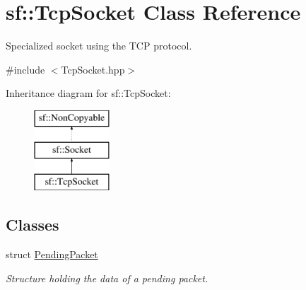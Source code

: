 \hypertarget{classsf_1_1_tcp_socket}{}\section{sf\+:\+:Tcp\+Socket Class Reference}
\label{classsf_1_1_tcp_socket}


Specialized socket using the T\+CP protocol.  




{\ttfamily \#include $<$Tcp\+Socket.\+hpp$>$}

Inheritance diagram for sf\+:\+:Tcp\+Socket\+:\begin{figure}[H]
\begin{center}
\leavevmode
\includegraphics[height=3.000000cm]{classsf_1_1_tcp_socket}
\end{center}
\end{figure}
\subsection*{Classes}
\begin{DoxyCompactItemize}
\item 
struct \mbox{\hyperlink{structsf_1_1_tcp_socket_1_1_pending_packet}{Pending\+Packet}}
\begin{DoxyCompactList}\small\item\em Structure holding the data of a pending packet. \end{DoxyCompactList}\end{DoxyCompactItemize}
